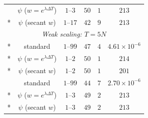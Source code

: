 \begin{longtable}{@{}cccccc@{}}
 & $\psi$ ($w=e^{\lambda\Delta T}$) & $1$--$3$ & $50$ & $1$ & $213$\\*
 & $\psi$ (secant $w$) & $1$--$17$ & $42$ & $9$ & $213$\\
\midrule
\multicolumn{6}{c}{\textit{Weak scaling: $T=5N$}}\\*
\multirow{3}{*}{$10$} & standard & $1$--$99$ & $47$ & $4$ & $4.61\times 10^{-6}$\\*
 & $\psi$ ($w=e^{\lambda\Delta T}$) & $1$--$2$ & $50$ & $1$ & $214$\\*
 & $\psi$ (secant $w$) & $1$--$2$ & $50$ & $1$ & $201$\\
\addlinespace[3pt]
\multirow{3}{*}{$100$} & standard & $1$--$99$ & $44$ & $7$ & $2.70\times 10^{-6}$\\*
 & $\psi$ ($w=e^{\lambda\Delta T}$) & $1$--$3$ & $49$ & $2$ & $213$\\*
 & $\psi$ (secant $w$) & $1$--$3$ & $49$ & $2$ & $213$\\
\end{longtable}\endgroup
